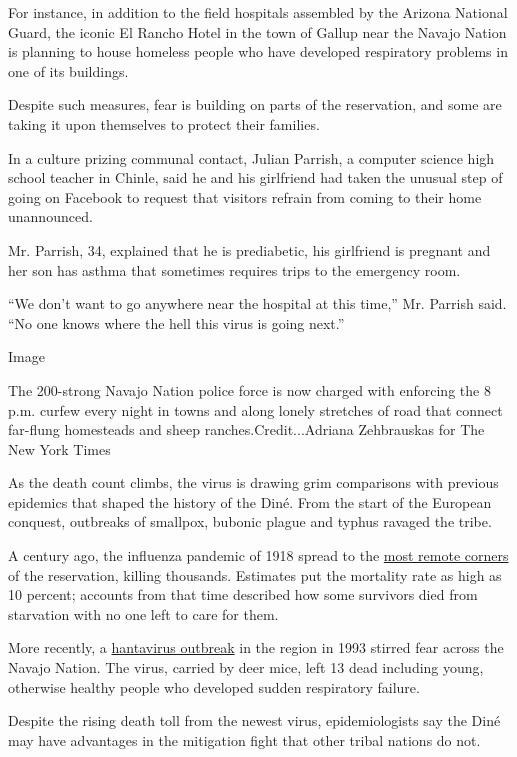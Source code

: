 For instance, in addition to the field hospitals assembled by the
Arizona National Guard, the iconic El Rancho Hotel in the town of Gallup
near the Navajo Nation is planning to house homeless people who have
developed respiratory problems in one of its buildings.

Despite such measures, fear is building on parts of the reservation, and
some are taking it upon themselves to protect their families.

In a culture prizing communal contact, Julian Parrish, a computer
science high school teacher in Chinle, said he and his girlfriend had
taken the unusual step of going on Facebook to request that visitors
refrain from coming to their home unannounced.

Mr. Parrish, 34, explained that he is prediabetic, his girlfriend is
pregnant and her son has asthma that sometimes requires trips to the
emergency room.

``We don't want to go anywhere near the hospital at this time,'' Mr.
Parrish said. ``No one knows where the hell this virus is going next.''

Image

The 200-strong Navajo Nation police force is now charged with enforcing
the 8 p.m. curfew every night in towns and along lonely stretches of
road that connect far-flung homesteads and sheep
ranches.Credit...Adriana Zehbrauskas for The New York Times

As the death count climbs, the virus is drawing grim comparisons with
previous epidemics that shaped the history of the Diné. From the start
of the European conquest, outbreaks of smallpox, bubonic plague and
typhus ravaged the tribe.

A century ago, the influenza pandemic of 1918 spread to the
\href{https://www.jstor.org/stable/pdf/10.5250/amerindiquar.38.4.0459.pdf?refreqid=excelsior\%3A70667e3ff079d8c69050297f2972d443}{most
remote corners} of the reservation, killing thousands. Estimates put the
mortality rate as high as 10 percent; accounts from that time described
how some survivors died from starvation with no one left to care for
them.

More recently, a
\href{https://www.aaas.org/virus-rocked-four-corners-reemerges}{hantavirus
outbreak} in the region in 1993 stirred fear across the Navajo Nation.
The virus, carried by deer mice, left 13 dead including young, otherwise
healthy people who developed sudden respiratory failure.

Despite the rising death toll from the newest virus, epidemiologists say
the Diné may have advantages in the mitigation fight that other tribal
nations do not.

